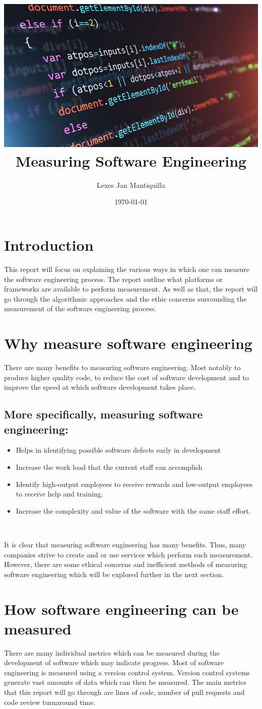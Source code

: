 \documentclass{article}
\title{\includegraphics[width=\textwidth]{images/cover.jpg}\\Measuring Software Engineering}
\author{Lexes Jan Mantiquilla}
\date{\today}
\begin{document}
\maketitle
\newpage

\tableofcontents
\newpage

\section{Introduction}
This report will focus on explaining the various ways in which one can measure
the software engineering process. The report outline what platforms or
frameworks are available to perform measurement. As well as that, the report
will go through the algorithmic approaches and the ethic concerns surrounding
the measurement of the software engineering process.

\section{Why measure software engineering}
There are many benefits to measuring software engineering. Most notably to
produce higher quality code, to reduce the cost of software development and to
improve the speed at which software development takes place.
\subsection{More specifically, measuring software engineering:}
\begin{itemize}
  \item Helps in identifying possible software defects early in development
  \item Increase the work load that the current staff can accomplish
  \item Identify high-output employees to receive rewards and low-output
    employees to receive help and training.
  \item Increase the complexity and value of the software with the same staff
    effort.
\end{itemize}
~\cite{scacchi1995understanding}

It is clear that measuring software engineering has many benefits. Thus, many
companies strive to create and or use services which perform such measurement.
However, there are some ethical concerns and inefficient methods of measuring
software engineering which will be explored further in the next section.

\section{How software engineering can be measured}
There are many individual metrics which can be measured during the development
of software which may indicate progress. Most of software engineering is
measured using a version control system. Version control systems generate vast
amounts of data which can then be measured. The main metrics that this report
will go through are lines of code, number of pull requests and code review
turnaround time.
\end{document}

